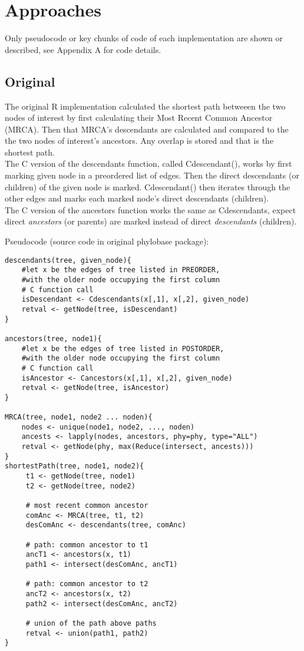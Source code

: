 \documentclass[11pt,letterpaper]{article}
\begin{document}
\section{Approaches}

Only pseudocode or key chunks of code of each implementation are shown or described,
see Appendix A for code details.

\subsection{Original}
The original R implementation calculated the shortest path betweeen the two nodes of interest by first calculating their Most Recent Common Ancestor (MRCA). Then that MRCA's descendants are calculated and compared to the the two nodes of interest's ancestors. Any overlap is stored and that is the shortest path. \\
The C version of the descendants function, called Cdescendant(), works by first marking given node in a preordered list of edges. Then the direct descendants (or children) of the given node is marked. Cdescendant() then iterates through the other edges and marks each marked node's direct descendants (children).\\
The C version of the ancestors function works the same as Cdescendants, expect direct \textit{ancestors} (or parents) are marked instead of direct \textit{descendants} (children).

Pseudocode (source code in original phylobase package):
\begin{lstlisting}[style=MyR]
descendants(tree, given_node){
	#let x be the edges of tree listed in PREORDER,
	#with the older node occupying the first column
	# C function call
	isDescendant <- Cdescendants(x[,1], x[,2], given_node)
	retval <- getNode(tree, isDescendant)
}

ancestors(tree, node1){
	#let x be the edges of tree listed in POSTORDER,
	#with the older node occupying the first column
	# C function call
	isAncestor <- Cancestors(x[,1], x[,2], given_node)
	retval <- getNode(tree, isAncestor)
}

MRCA(tree, node1, node2 ... noden){
	nodes <- unique(node1, node2, ..., noden)
	ancests <- lapply(nodes, ancestors, phy=phy, type="ALL")
    retval <- getNode(phy, max(Reduce(intersect, ancests)))
}
shortestPath(tree, node1, node2){
     t1 <- getNode(tree, node1)
     t2 <- getNode(tree, node2)

     # most recent common ancestor
     comAnc <- MRCA(tree, t1, t2) 
     desComAnc <- descendants(tree, comAnc)

     # path: common ancestor to t1
     ancT1 <- ancestors(x, t1)
     path1 <- intersect(desComAnc, ancT1) 

     # path: common ancestor to t2
     ancT2 <- ancestors(x, t2)
     path2 <- intersect(desComAnc, ancT2)

     # union of the path above paths
     retval <- union(path1, path2)
}
\end{lstlisting}
\end{document}
